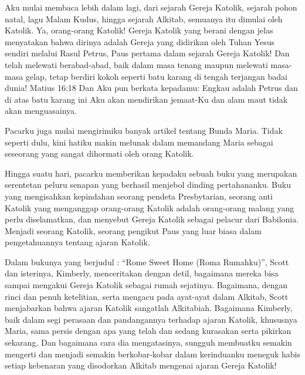 Aku mulai membaca lebih dalam lagi, dari sejarah Gereja Katolik, sejarah pohon natal, lagu Malam Kudus, hingga sejarah Alkitab, semuanya itu dimulai oleh Katolik. Ya, orang-orang Katolik! Gereja Katolik yang berani dengan jelas menyatakan bahwa dirinya adalah Gereja yang didirikan oleh Tuhan Yesus sendiri melalui Rasul Petrus, Paus pertama dalam sejarah Gereja Katolik! Dan telah melewati berabad-abad, baik dalam masa tenang maupun melewati masa-masa gelap, tetap berdiri kokoh seperti batu karang di tengah terjangan badai dunia!
Matius 16:18 Dan Aku pun berkata kepadamu: Engkau adalah Petrus dan di atas batu karang ini Aku akan mendirikan jemaat-Ku dan alam maut tidak akan menguasainya.

Pacarku juga mulai mengirimiku banyak artikel tentang Bunda Maria. Tidak seperti dulu, kini hatiku makin melunak dalam memandang Maria sebagai seseorang yang sangat dihormati oleh orang Katolik.

Hingga suatu hari, pacarku memberikan kepadaku sebuah buku yang merupakan serentetan peluru senapan yang berhasil menjebol dinding pertahananku. Buku yang mengisahkan kepindahan seorang pendeta Presbytarian, seorang anti Katolik yang menganggap orang-orang Katolik adalah orang-orang malang yang perlu diselamatkan, dan menyebut Gereja Katolik sebagai pelacur dari Babilonia. Menjadi seorang Katolik, seorang pengikut Paus yang luar biasa dalam pengetahuannya tentang ajaran Katolik.

Dalam bukunya yang berjudul : “Rome Sweet Home (Roma Rumahku)”, Scott dan isterinya, Kimberly, menceritakan dengan detil, bagaimana mereka bisa sampai mengakui Gereja Katolik sebagai rumah sejatinya. Bagaimana, dengan rinci dan penuh ketelitian, serta mengacu pada ayat-ayat dalam Alkitab, Scott menjabarkan bahwa ajaran Katolik sangatlah Alkitabiah. Bagaimana Kimberly, baik dalam segi perasaan dan pandangannya terhadap ajaran Katolik, khususnya Maria, sama persis dengan apa yang telah dan sedang kurasakan serta pikirkan sekarang. Dan bagaimana cara dia mengatasinya, sungguh membuatku semakin mengerti dan menjadi semakin berkobar-kobar dalam kerinduanku meneguk habis setiap kebenaran yang disodorkan Alkitab mengenai ajaran Gereja Katolik!

